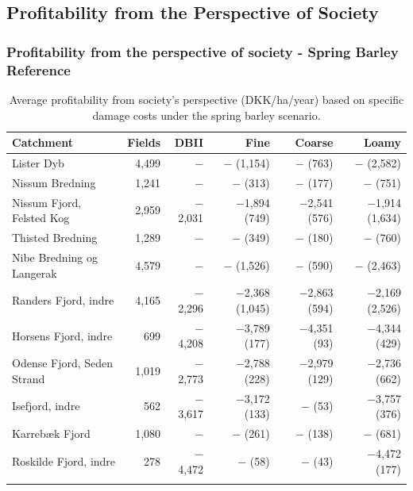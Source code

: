 \documentclass[12pt]{article}
\begin{document}
\subsection{Profitability from the Perspective of Society}

\subsubsection{Profitability from the perspective of society - Spring Barley Reference}
\label{Profitability from the perspective of society - Spring Barley Reference}

\begin{table}[H]
\centering
\small
\caption{Average profitability from society's perspective (DKK/ha/year) based on specific damage costs under the spring barley scenario.}
\label{tab:dbii-vaarbyg-specific}
\begin{threeparttable}
\begin{tabular}{lrrrrr}
\toprule
\textbf{Catchment} & \textbf{Fields} & \textbf{DBII} & \textbf{Fine} &
\textbf{Coarse} & \textbf{Loamy} \\
\midrule\addlinespace
Lister Dyb                 & 4,499 &     $-$  & $-$ (1,154)    & $-$ (763)      & $-$ (2,582)      \\
Nissum Bredning            & 1,241 &     $-$  & $-$ (313)      & $-$ (177)      & $-$ (751)        \\
Nissum Fjord, Felsted Kog  & 2,959 & $-$2,031 & $-$1,894 (749) & $-$2,541 (576) & $-$1,914 (1,634) \\
Thisted Bredning           & 1,289 &     $-$  & $-$ (349)      & $-$ (180)      & $-$ (760)        \\
Nibe Bredning og Langerak  & 4,579 &     $-$  & $-$ (1,526)    & $-$ (590)      & $-$ (2,463)      \\
Randers Fjord, indre       & 4,165 & $-$2,296 & $-$2,368 (1,045) & $-$2,863 (594) & $-$2,169 (2,526) \\
Horsens Fjord, indre       &   699 & $-$4,208 & $-$3,789 (177) & $-$4,351 (93)  & $-$4,344 (429)   \\
Odense Fjord, Seden Strand & 1,019 & $-$2,773 & $-$2,788 (228) & $-$2,979 (129) & $-$2,736 (662)   \\
Isefjord, indre            &   562 & $-$3,617 & $-$3,172 (133) & $-$ (53)       & $-$3,757 (376)   \\
Karrebæk Fjord             & 1,080 &     $-$  & $-$ (261)      & $-$ (138)      & $-$ (681)        \\
Roskilde Fjord, indre      &   278 & $-$4,472 & $-$ (58)       & $-$ (43)       & $-$4,472 (177)   \\
\addlinespace\bottomrule
\end{tabular}
\end{threeparttable}
\end{table}
\end{document}
